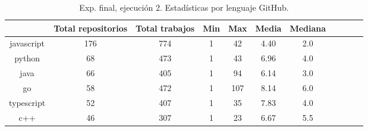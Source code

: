 \begin{table}[h]
  \centering
  \caption{Exp. final, ejecución 2. Estadísticas por lenguaje GitHub.}
  \label{tab:tabla_f2_4}

\begin{footnotesize}
\renewcommand{\arraystretch}{1.5} %
\begin{tabular}{ccccccccccc}
  \hline
  {} &  Total repositorios &  Total trabajos &  Min &  Max &  Media &  Mediana \\
  \hline
  javascript    &        176 &         774 &    1 &   42 &    4.40 &      2.0 \\
  python        &         68 &         473 &    1 &   43 &    6.96 &      4.0 \\
  java          &         66 &         405 &    1 &   94 &    6.14 &      3.0 \\
  go            &         58 &         472 &    1 &  107 &    8.14 &      6.0 \\
  typescript    &         52 &         407 &    1 &   35 &    7.83 &      4.0 \\
  c++           &         46 &         307 &    1 &   23 &    6.67 &      5.5 \\

\end{tabular}
\end{footnotesize}
\end{table}
